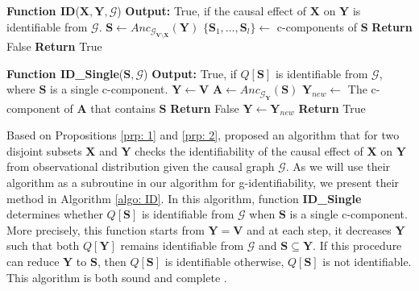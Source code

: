 \documentclass[accepted]{uai2022}
\newcommand{\Anc}[2]{\textit{Anc}_{#2}(#1)}
\newcommand{\V}[0]{\mathbf{V}}
\newcommand{\X}[0]{\mathbf{X}}
\newcommand{\Y}[0]{\mathbf{Y}}
\newcommand{\G}[0]{\mathcal{G}}
\begin{document}
        \begin{algorithm}[t]
            \caption{Identifiability}
            \label{algo: ID}
            \begin{algorithmic}[1]
                \STATE \textbf{Function ID}($\X,\Y,\G$)
                \STATE \textbf{Output:} True, if the causal effect of $\X$ on $\Y$ is identifiable from $\G$. 
                \STATE $\mathbf{S} \gets \Anc{\Y}{\G_{\V \setminus \X}}$
                \STATE $\{\mathbf{S}_1,\dots,\mathbf{S}_l\} \gets$ c-components of $\mathbf{S}$
                    \IF{\textbf{ID\_Single}($\mathbf{S}_i,\G$) = False}
                        \STATE \textbf{Return} False
                    \ENDIF
                \ENDFOR
                \STATE \textbf{Return} True
            \end{algorithmic}
            \hrulefill
            \begin{algorithmic}[1]
                \STATE \textbf{Function ID\_Single}($\mathbf{S},\G$)
                \STATE \textbf{Output:} True, if $Q[\mathbf{S}]$ is identifiable from $\G$, where $\mathbf{S}$ is a single c-component.
                \STATE $\Y \gets \V$
                \WHILE{$\Y \neq \mathbf{S}$}
                    \STATE $\mathbf{A} \gets \Anc{\mathbf{S}}{\G_{\Y}}$
                    \STATE $\Y_{new} \gets $ The c-component of $\mathbf{A}$ that contains $\mathbf{S}$
                    \IF{$\Y_{new} = \Y$}
                        \STATE \textbf{Return} False
                    \ELSE
                        \STATE $\Y \gets \Y_{new}$
                    \ENDIF
                \ENDWHILE
                \STATE \textbf{Return} True
            \end{algorithmic}
        \end{algorithm}
        
        Based on Propositions \ref{prp: 1} and \ref{prp: 2}, \citep{tian2003ID} proposed an algorithm  that for two disjoint subsets $\X$ and $\Y$ checks the identifiability of the causal effect of $\X$ on $\Y$ from observational distribution given the causal graph $\G$.
        As we will use their algorithm as a subroutine in our algorithm for g-identifiability, we present their method in Algorithm \ref{algo: ID}. 
        In this algorithm, function \textbf{ID\_Single} determines whether $Q[\mathbf{S}]$ is identifiable from $\G$ when $\mathbf{S}$ is a single c-component. 
        More precisely, this function starts from $\Y = \V$ and at each step, it decreases $\Y$ such that both $Q[\Y]$ remains identifiable from $\G$ and $\mathbf{S} \subseteq \Y$.
        If this procedure can reduce $\Y$ to $\mathbf{S}$, then $Q[\mathbf{S}]$ is identifiable otherwise,  $Q[\mathbf{S}]$ is not identifiable. 
        This algorithm is both sound and complete \citep{shpitser2006identification, huang2008completeness}.
        
\end{document}
